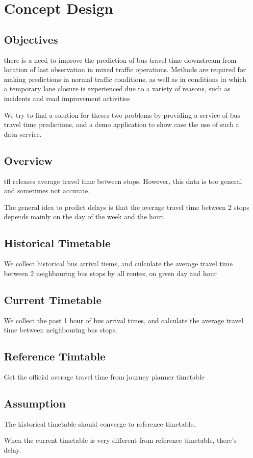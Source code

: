 \chapter{Concept Design}
\section{Objectives}
 there is a need to improve the prediction of bus travel time downstream from location of last observation in mixed traffic operations. Methods are required for making predictions in normal traffic conditions, as well as in conditions in which a temporary lane closure is experienced due to a variety of reasons, such as incidents and road improvement activities

We try to find a solution for theses two problems by providing a service of bus travel time predictions, and a demo application to show case the use of such a data service.

\section{Overview}
\par \acrshort{tfl} releases average travel time between stops. However, this data is too general and sometimes not accurate.

\par The general idea to predict delays is that the average travel time between 2 stops depends mainly on the day of the week and the hour.

\section{Historical Timetable}
\par We collect historical bus arrival tiems, and culculate the average travel time between 2 neighbouring bus stops by all routes, on given day and hour

\section{Current Timetable}
\par We collect the past 1 hour of bus arrival times, and calculate the average travel time between neighbouring bus stops.

\section{Reference Timtable}
\par Get the official average travel time from journey planner timetable

\section{Assumption}
\par The historical timetable should converge to reference timetable.

\par When the current timetable is very different from reference timetable, there's delay.
